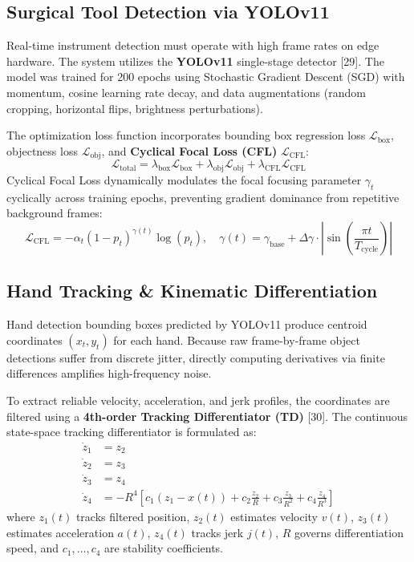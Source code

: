 \documentclass[12pt,a4paper]{report}
\begin{document}
\subsection{Surgical Tool Detection via YOLOv11}
Real-time instrument detection must operate with high frame rates on edge hardware. The system utilizes the \textbf{YOLOv11} single-stage detector [29]. The model was trained for 200 epochs using Stochastic Gradient Descent (SGD) with momentum, cosine learning rate decay, and data augmentations (random cropping, horizontal flips, brightness perturbations).

The optimization loss function incorporates bounding box regression loss $\mathcal{L}_{\text{box}}$, objectness loss $\mathcal{L}_{\text{obj}}$, and \textbf{Cyclical Focal Loss (CFL)} $\mathcal{L}_{\text{CFL}}$:
\begin{equation}
    \mathcal{L}_{\text{total}} = \lambda_{\text{box}} \mathcal{L}_{\text{box}} + \lambda_{\text{obj}} \mathcal{L}_{\text{obj}} + \lambda_{\text{CFL}} \mathcal{L}_{\text{CFL}}
\end{equation}
Cyclical Focal Loss dynamically modulates the focal focusing parameter $\gamma_t$ cyclically across training epochs, preventing gradient dominance from repetitive background frames:
\begin{equation}
    \mathcal{L}_{\text{CFL}} = -\alpha_t (1 - p_t)^{\gamma(t)} \log(p_t), \quad \gamma(t) = \gamma_{\text{base}} + \Delta \gamma \cdot \left|\sin\left(\frac{\pi t}{T_{\text{cycle}}}\right)\right|
\end{equation}

\subsection{Hand Tracking \& Kinematic Differentiation}
Hand detection bounding boxes predicted by YOLOv11 produce centroid coordinates $(x_t, y_t)$ for each hand. Because raw frame-by-frame object detections suffer from discrete jitter, directly computing derivatives via finite differences amplifies high-frequency noise.

To extract reliable velocity, acceleration, and jerk profiles, the coordinates are filtered using a \textbf{4th-order Tracking Differentiator (TD)} [30]. The continuous state-space tracking differentiator is formulated as:
\begin{equation}
    \begin{aligned}
        \dot{z}_1 &= z_2 \\
        \dot{z}_2 &= z_3 \\
        \dot{z}_3 &= z_4 \\
        \dot{z}_4 &= -R^4 \left[ c_1(z_1 - x(t)) + c_2 \frac{z_2}{R} + c_3 \frac{z_3}{R^2} + c_4 \frac{z_4}{R^3} \right]
    \end{aligned}
\end{equation}
where $z_1(t)$ tracks filtered position, $z_2(t)$ estimates velocity $v(t)$, $z_3(t)$ estimates acceleration $a(t)$, $z_4(t)$ tracks jerk $j(t)$, $R$ governs differentiation speed, and $c_1, \dots, c_4$ are stability coefficients.
\end{document}
